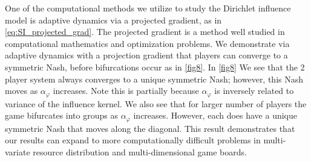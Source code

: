\documentclass{article}
\begin{document}
     One of the computational methods we utilize to study the Dirichlet influence model is adaptive dynamics via a projected gradient, as in \cref{eq:SI_projected_grad}. The projected gradient is a method well studied in computational mathematics and optimization problems. We demonstrate via adaptive dynamics with a projection gradient that players can converge to a symmetric Nash, before bifurcations occur as in \cref{fig8}. In \cref{fig8} We see that the 2 player system always converges to a unique symmetric Nash; however, this Nash moves as $\alpha_\varphi$ increases. Note this is partially because $\alpha_\varphi$ is inversely related to variance of the influence kernel. We also see that for larger number of players the game bifurcates into groups as $\alpha_\varphi$ increases. However, each does have a unique symmetric Nash that moves along the diagonal. This result demonstrates that our results can expand to more computationally difficult problems in multi-variate resource distribution and multi-dimensional game boards. 
\end{document}
